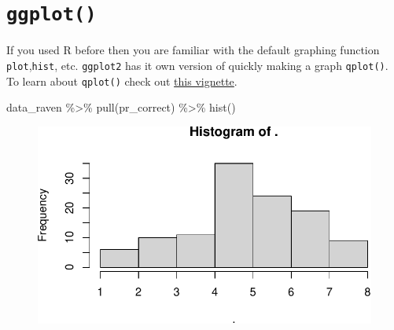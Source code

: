 \documentclass[
  letterpaper,
]{book}
\newenvironment{Shaded}{\begin{snugshade}}{\end{snugshade}}
\newcommand{\AttributeTok}[1]{\textcolor[rgb]{0.40,0.45,0.13}{#1}}
\newcommand{\FunctionTok}[1]{\textcolor[rgb]{0.28,0.35,0.67}{#1}}
\newcommand{\NormalTok}[1]{\textcolor[rgb]{0.00,0.23,0.31}{#1}}
\newcommand{\SpecialCharTok}[1]{\textcolor[rgb]{0.37,0.37,0.37}{#1}}
\newcommand{\StringTok}[1]{\textcolor[rgb]{0.13,0.47,0.30}{#1}}
\begin{document}
\hypertarget{ggplot}{%
\section{\texorpdfstring{\texttt{ggplot()}}{ggplot()}}\label{ggplot}}

If you used R before then you are familiar with the default graphing
function \texttt{plot},\texttt{hist}, etc. \texttt{ggplot2} has it own
version of quickly making a graph \texttt{qplot()}. To learn about
\texttt{qplot()} check out
\href{http://www.sthda.com/english/wiki/qplot-quick-plot-with-ggplot2-r-software-and-data-visualization}{this
vignette}.

\begin{Shaded}
\begin{Highlighting}[]
\NormalTok{data\_raven }\SpecialCharTok{\%\textgreater{}\%} \FunctionTok{pull}\NormalTok{(pr\_correct) }\SpecialCharTok{\%\textgreater{}\%} \FunctionTok{hist}\NormalTok{() }
\end{Highlighting}
\end{Shaded}

\begin{figure}[H]

{\centering \includegraphics{./data_viz_files/figure-pdf/unnamed-chunk-13-1.pdf}

}

\end{figure}

\begin{Shaded}
\end{Shaded}
\end{document}
